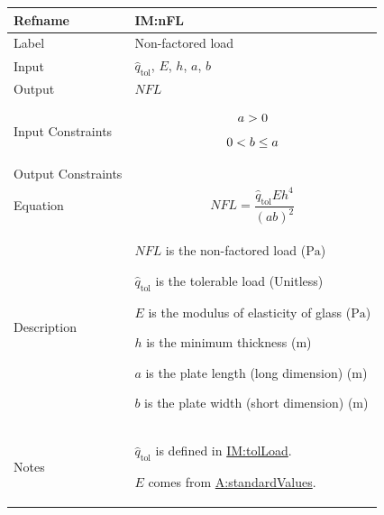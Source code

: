 \documentclass[12pt]{article}
\newcommand{\gt}{\ensuremath >}
\newcommand{\lt}{\ensuremath <}
\begin{document}
\medskip
\noindent
\begin{minipage}{\textwidth}
\begin{tabular}{>{\raggedright}p{}>{\raggedright\arraybackslash}p{}}
\toprule \textbf{Refname} & \textbf{IM:nFL}
\label{IM:nFL}
\\ \midrule
Label & Non-factored load
        
\\ \midrule
Input & ${\hat{q}_{\text{tol}}}$, $E$, $h$, $a$, $b$
        
\\ \midrule
Output & $\mathit{NFL}$
         
\\ \midrule
Input Constraints & \begin{displaymath}
                    a\gt{}0
                    \end{displaymath}
                    \begin{displaymath}
                    0\lt{}b\leq{}a
                    \end{displaymath}
\\ \midrule
Output Constraints & 
\\ \midrule
Equation & \begin{displaymath}
           \mathit{NFL}=\frac{{\hat{q}_{\text{tol}}} E h^{4}}{\left(a b\right)^{2}}
           \end{displaymath}
\\ \midrule
Description & \begin{symbDescription}
              \item{$\mathit{NFL}$ is the non-factored load (${\text{Pa}}$)}
              \item{${\hat{q}_{\text{tol}}}$ is the tolerable load (Unitless)}
              \item{$E$ is the modulus of elasticity of glass (${\text{Pa}}$)}
              \item{$h$ is the minimum thickness (${\text{m}}$)}
              \item{$a$ is the plate length (long dimension) (${\text{m}}$)}
              \item{$b$ is the plate width (short dimension) (${\text{m}}$)}
              \end{symbDescription}
\\ \midrule
Notes & ${\hat{q}_{\text{tol}}}$ is defined in \hyperref[IM:tolLoad]{IM:tolLoad}.
        
        $E$ comes from \hyperref[assumpSV]{A:standardValues}.
        

\end{tabular}
\end{minipage}
\end{document}
